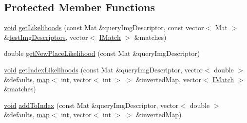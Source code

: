 \subsection*{Protected Member Functions}
\begin{DoxyCompactItemize}
\item 
\hyperlink{legacy_8hpp_a8bb47f092d473522721002c86c13b94e}{void} \hyperlink{classcv_1_1of2_1_1FabMap2_a15c86c75b94519a94c8a1874a94ea50d}{get\-Likelihoods} (const Mat \&query\-Img\-Descriptor, const vector$<$ Mat $>$ \&\hyperlink{classcv_1_1of2_1_1FabMap_a46f350e86965ec1e00ae4bd629dd4c8d}{test\-Img\-Descriptors}, vector$<$ \hyperlink{structcv_1_1of2_1_1IMatch}{I\-Match} $>$ \&matches)
\item 
double \hyperlink{classcv_1_1of2_1_1FabMap2_a59c05ae4eaab2652ac372656f5b91da0}{get\-New\-Place\-Likelihood} (const Mat \&query\-Img\-Descriptor)
\item 
\hyperlink{legacy_8hpp_a8bb47f092d473522721002c86c13b94e}{void} \hyperlink{classcv_1_1of2_1_1FabMap2_a42fbce9897e5e25a116fa4f3a0845264}{get\-Index\-Likelihoods} (const Mat \&query\-Img\-Descriptor, vector$<$ double $>$ \&defaults, \hyperlink{core__c_8h_a035af1d430a8c9a1d115cbfb6c8e25dc}{map}$<$ int, vector$<$ int $>$ $>$ \&inverted\-Map, vector$<$ \hyperlink{structcv_1_1of2_1_1IMatch}{I\-Match} $>$ \&matches)
\item 
\hyperlink{legacy_8hpp_a8bb47f092d473522721002c86c13b94e}{void} \hyperlink{classcv_1_1of2_1_1FabMap2_af47c71c9c0dc5a25330a2177d6fbb1be}{add\-To\-Index} (const Mat \&query\-Img\-Descriptor, vector$<$ double $>$ \&defaults, \hyperlink{core__c_8h_a035af1d430a8c9a1d115cbfb6c8e25dc}{map}$<$ int, vector$<$ int $>$ $>$ \&inverted\-Map)
\end{DoxyCompactItemize}
